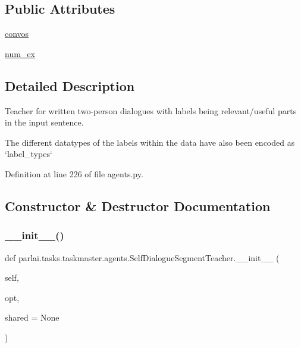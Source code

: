 \subsection*{Public Attributes}
\begin{DoxyCompactItemize}
\item 
\hyperlink{classparlai_1_1tasks_1_1taskmaster_1_1agents_1_1SelfDialogueSegmentTeacher_aced6b44c6ab5da0943ebd6f16acc5339}{convos}
\item 
\hyperlink{classparlai_1_1tasks_1_1taskmaster_1_1agents_1_1SelfDialogueSegmentTeacher_a231381551fe76fdbf333c0fd8c671b5e}{num\+\_\+ex}
\end{DoxyCompactItemize}


\subsection{Detailed Description}
\begin{DoxyVerb}Teacher for written two-person dialogues with labels being relevant/useful parts in
the input sentence.

The different datatypes of the labels within the data have also been encoded as
`label_types`
\end{DoxyVerb}
 

Definition at line 226 of file agents.\+py.



\subsection{Constructor \& Destructor Documentation}
\mbox{\label{classparlai_1_1tasks_1_1taskmaster_1_1agents_1_1SelfDialogueSegmentTeacher_a508d7db21bcb258cbeb1d89c5f33d6a3}} 
\subsubsection{\texorpdfstring{\+\_\+\+\_\+init\+\_\+\+\_\+()}{\_\_init\_\_()}}
{\footnotesize\ttfamily def parlai.\+tasks.\+taskmaster.\+agents.\+Self\+Dialogue\+Segment\+Teacher.\+\_\+\+\_\+init\+\_\+\+\_\+ (\begin{DoxyParamCaption}\item[{}]{self,  }\item[{}]{opt,  }\item[{}]{shared = {\ttfamily None} }\end{DoxyParamCaption})}



